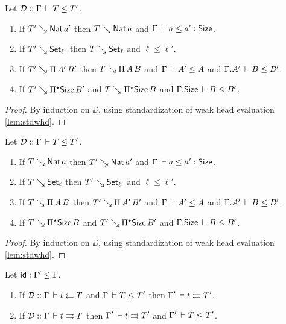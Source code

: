 \documentclass[acmlarge,review,anonymous]{acmart}\settopmatter{printfolios=true}
\begin{document}
\begin{lemma}
\label{lem:whdsub}
Let $\DD :: \Gamma \der T \leq T'$.
\begin{enumerate}
\item If $T' \evalsto \Nat a'$ then $T \evalsto \Nat a$ and $\Gamma \der a \leq a' : \Size$.
\item If $T' \evalsto \Set[\ell']$ then $T \evalsto \Set[\ell]$ and $\ell \leq \ell'$.
\item If $T' \evalsto \piT{A'}{B'}$ then $T \evalsto \piT {A} {B}$ and
      $\Gamma \der A' \leq A$ and $\cext \Gamma {A'} \der B \leq B'$.
\item If $T' \evalsto \epiT \Size {B'}$ and $T \evalsto \epiT \Size B$ and $\cext \Gamma \Size \der B \leq B'$.
\end{enumerate}
\end{lemma}
\begin{proof}
  By induction on $\DD$, using standardization of weak head evaluation \ref{lem:stdwhd}.
\end{proof}
\begin{lemma}
\label{lem:whdsuper}
Let $\DD :: \Gamma \der T \leq T'$.
\begin{enumerate}
\item If $T \evalsto \Nat a$ then $T' \evalsto \Nat a'$ and $\Gamma \der a \leq a' : \Size$.
\item If $T \evalsto \Set[\ell]$ then $T' \evalsto \Set[\ell']$ and $\ell \leq \ell'$.
\item If $T \evalsto \piT A B$ then $T' \evalsto \piT {A'} {B'}$ and
      $\Gamma \der A' \leq A$ and $\cext \Gamma {A'} \der B \leq B'$.
\item If $T \evalsto \epiT \Size B$ and $T' \evalsto \epiT \Size B'$ and $\cext \Gamma \Size \der B \leq B'$.
\end{enumerate}
\end{lemma}
\begin{proof}
  By induction on $\DD$, using standardization of weak head evaluation \ref{lem:stdwhd}.
\end{proof}
\begin{lemma}
  \label{lem:subtc}
  Let $\sid : \Gamma' \leq \Gamma$.
  \begin{enumerate}
  \item If $\DD :: \Gamma \der t \jchk T$ and $\Gamma \der T \leq T'$ then $\Gamma' \der t \jchk T'$.
  \item If $\DD :: \Gamma \der t \jinf T$ then $\Gamma' \der t \jinf T'$ and $\Gamma' \der T \leq T'$.
  \end{enumerate}
\end{lemma}
\end{document}
